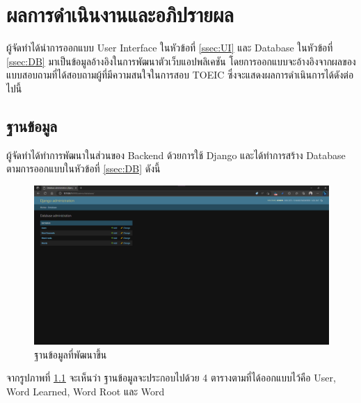 \documentclass[12pt,oneside,openright,a4paper]{cpe-thai-project}
\begin{document}
\chapter{ผลการดำเนินงานและอภิปรายผล}

\hspace{1cm}
ผู้จัดทำได้นำการออกแบบ User Interface ในหัวข้อที่ \ref{ssec:UI} และ Database ในหัวข้อที่ \ref{ssec:DB}
มาเป็นข้อมูลอ้างอิงในการพัฒนาตัวเว็บแอปพลิเคชัน โดยการออกแบบจะอ้างอิงจากผลของแบบสอบถามที่ได้สอบถามผู้ที่มีความสนใจในการสอบ TOEIC 
ซึ่งจะแสดงผลการดำเนินการได้ดังต่อไปนี้

\section{ฐานข้อมูล}
\hspace{1cm}
ผู้จัดทำได้ทำการพัฒนาในส่วนของ Backend ด้วยการใช้ Django และได้ทำการสร้าง Database ตามการออกแบบในหัวข้อที่ \ref{ssec:DB}
ดังนี้

\begin{figure}[!h]\centering
	\includegraphics[width=\textwidth, keepaspectratio=true]{image/chap4/DB/db.png}
	\caption{{ฐานข้อมูลที่พัฒนาขึ้น}}\label{fig:chap4DB}
\end{figure}
\hspace{1cm}
จากรูปภาพที่ \ref{fig:chap4DB} จะเห็นว่า ฐานข้อมูลจะประกอบไปด้วย 4 ตารางตามที่ได้ออกแบบไว้คือ User, Word Learned,
Word Root และ Word
\end{document}
